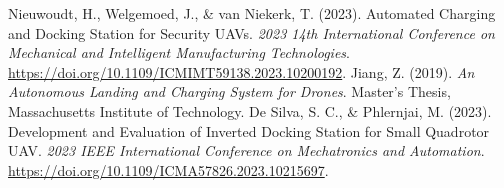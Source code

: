\begin{thebibliography}{30}
     Nieuwoudt, H., Welgemoed, J., \& van Niekerk, T. (2023). Automated Charging and Docking Station for Security UAVs. \textit{2023 14th International Conference on Mechanical and Intelligent Manufacturing Technologies}. \url{https://doi.org/10.1109/ICMIMT59138.2023.10200192}.
     Jiang, Z. (2019). \textit{An Autonomous Landing and Charging System for Drones}. Master's Thesis, Massachusetts Institute of Technology.
     De Silva, S. C., \& Phlernjai, M. (2023). Development and Evaluation of Inverted Docking Station for Small Quadrotor UAV. \textit{2023 IEEE International Conference on Mechatronics and Automation}. \url{https://doi.org/10.1109/ICMA57826.2023.10215697}.
    
    

\end{thebibliography}

